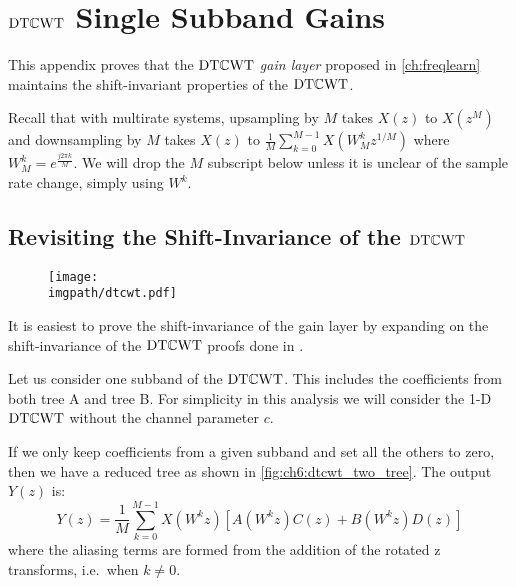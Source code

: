 \chapter{$\mathrm{DT}\mathbb{C}\mathrm{WT}$ Single Subband Gains}\label{app:ch6:dtcwt}
\def \path {freqlearn/}
\def \imgpath {freqlearn/images}

This appendix proves that the $\mathrm{DT}\mathbb{C}\mathrm{WT}$ \emph{gain layer} proposed in
\autoref{ch:freqlearn} maintains the shift-invariant properties of the
$\mathrm{DT}\mathbb{C}\mathrm{WT}$.

Recall that with multirate systems, upsampling by $M$ takes $X(z)$ to
$X(z^M)$ and downsampling by $M$ takes $X(z)$ to $\frac{1}{M}\sum_{k=0}^{M-1} X(W_M^k
z^{1/M})$ where $W_M^k = e^{\frac{j2\pi k}{M}}$. We will drop the $M$ subscript
below unless it is unclear of the sample rate change, simply using $W^k$.


\section{Revisiting the Shift-Invariance of the $\mathrm{DT}\mathbb{C}\mathrm{WT}$}

\begin{figure}[t]
  \centering
  \texttt{[image: \\imgpath/dtcwt.pdf]}
  \label{fig:ch6:dtcwt_two_tree}
\end{figure}
It is easiest to prove the shift-invariance of the gain layer by expanding on
the shift-invariance of the $\mathrm{DT}\mathbb{C}\mathrm{WT}$ proofs done in
\cite{kingsbury_complex_2001}.

Let us consider one subband of the $\mathrm{DT}\mathbb{C}\mathrm{WT}$. This includes the coefficients from
both tree A and tree B. For simplicity in this analysis we will consider the 1-D
$\mathrm{DT}\mathbb{C}\mathrm{WT}$ without the channel parameter $c$. 

If we only keep coefficients from a given
subband and set all the others to zero, then we have a reduced tree as shown in
\autoref{fig:ch6:dtcwt_two_tree}. The output $Y(z)$ is:
%
\begin{equation}
  Y(z) = \frac{1}{M} \sum_{k=0}^{M-1}X(W^k z) \left[A(W^k z)C(z) + B(W^k z)D(z)\right]
  \label{eq:ch6:aliasing}
\end{equation}
%
where the aliasing terms are formed from the addition of the rotated z
transforms, i.e.\ when $k \neq 0$.

